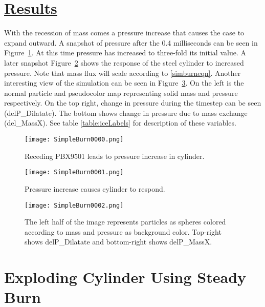 \newpage

\section*{\underline{Results}}
With the recession of mass comes a pressure increase that causes the case to expand outward. 
A snapshot of pressure after the 0.4 milliseconds can be seen in Figure~\ref{figsimburn1}.  At this time
pressure has increased to three-fold its initial value.  A later snapshot Figure~\ref{figsimburn2} shows
the response of the steel cylinder to increased pressure.  Note that mass flux will scale according
to \ref{simburneqn}.  Another interesting view of the simulation can be seen in Figure~\ref{figsimburn3}.
On the left is the normal particle and pseudocolor map representing solid mass and pressure respectively.
On the top right, change in pressure during the timestep can be seen (delP\_Dilatate).  The bottom shows
change in pressure due to mass exchange (del\_MassX).  See table \ref{table:iceLabels} for description of
these variables.


\begin{figure}
  \center
  \texttt{[image: SimpleBurn0000.png]}

  \caption{Receding PBX9501 leads to pressure increase in cylinder.}
  \label{figsimburn1}
\end{figure}

\begin{figure}
  \center
  \texttt{[image: SimpleBurn0001.png]}

  \caption{Pressure increase causes cylinder to respond.}
  \label{figsimburn2}
\end{figure}

\begin{figure}
  \center
  \texttt{[image: SimpleBurn0002.png]}

  \caption{The left half of the image represents particles as spheres colored according to mass and pressure as background color.  Top-right shows delP\_Dilatate and bottom-right shows delP\_MassX.}
  \label{figsimburn3}
\end{figure}

\newpage


%
\section*{\center Exploding Cylinder Using Steady Burn}
